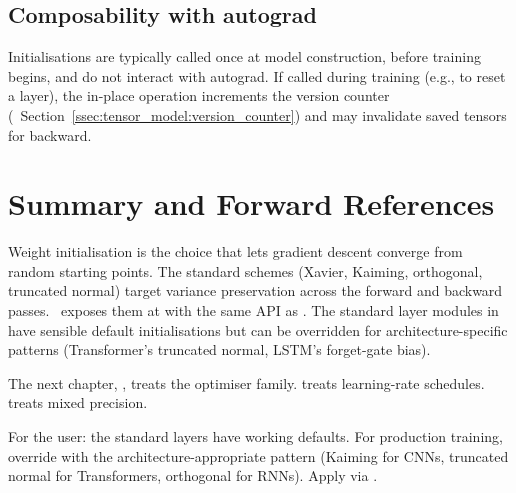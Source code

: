 \subsection{Composability with autograd}
\label{ssec:initialization:autograd}

Initialisations are typically called once at model construction,
before training begins, and do not interact with autograd. If
called during training (e.g., to reset a layer), the in-place
operation increments the version counter
(~Section~\ref{ssec:tensor_model:version_counter})
and may invalidate saved tensors for backward.

\section{Summary and Forward References}
\label{sec:initialization:summary}

Weight initialisation is the choice that lets gradient descent
converge from random starting points. The standard schemes
(Xavier, Kaiming, orthogonal, truncated normal) target variance
preservation across the forward and backward passes. \Lucid\
exposes them at  with the same API as
. The standard layer modules in  have
sensible default initialisations but can be overridden for
architecture-specific patterns (Transformer's truncated normal,
LSTM's forget-gate bias).

The next chapter, , treats the optimiser
family.  treats learning-rate schedules.
\chref{ch:amp} treats mixed precision.

\begin{lucidnote}
For the user: the standard layers have working defaults. For
production training, override with the architecture-appropriate
pattern (Kaiming for CNNs, truncated normal for Transformers,
orthogonal for RNNs). Apply via .
\end{lucidnote}
